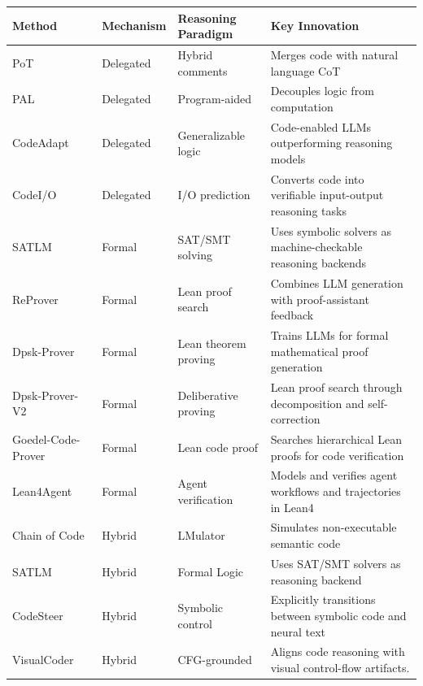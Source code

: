 \documentclass{llmxive}
\providecommand{\arraystretch}{1.15}
\begin{document}
\begin{table}[t]
\centering
\renewcommand{\arraystretch}{1.15}
\setlength{\tabcolsep}{4pt}
\footnotesize
\begin{tabularx}{\textwidth}{p{2.8cm}p{2.2cm}p{3.1cm}X}
\toprule
\textbf{Method} & \textbf{Mechanism} & \textbf{Reasoning Paradigm} & \textbf{Key Innovation} \\
\midrule
PoT~\cite{chen2022program} & Delegated & Hybrid comments & Merges code with natural language CoT \\
PAL~\cite{gao2023pal} & Delegated & Program-aided & Decouples logic from computation \\
CodeAdapt~\cite{zhang2025code} & Delegated & Generalizable logic & Code-enabled LLMs outperforming reasoning models \\
CodeI/O~\cite{pmlr-v267-li25t} & Delegated & I/O prediction & Converts code into verifiable input-output reasoning tasks \\
SATLM~\cite{ye2023satlm} & Formal & SAT/SMT solving & Uses symbolic solvers as machine-checkable reasoning backends \\
ReProver~\cite{yang2023leandojo} & Formal & Lean proof search & Combines LLM generation with proof-assistant feedback \\
Dpsk-Prover~\cite{xin2025deepseek} & Formal & Lean theorem proving & Trains LLMs for formal mathematical proof generation \\
Dpsk-Prover-V2~\cite{ren2025deepseek2} & Formal & Deliberative proving & Lean proof search through decomposition and self-correction \\
Goedel-Code-Prover~\cite{li2026goedel} & Formal & Lean code proof & Searches hierarchical Lean proofs for code verification \\
Lean4Agent~\cite{wang2026lean4agent} & Formal & Agent verification & Models and verifies agent workflows and trajectories in Lean4 \\
Chain of Code~\cite{li2023chain} & Hybrid & LMulator & Simulates non-executable semantic code \\
SATLM~\cite{ye2023satlm} & Hybrid & Formal Logic & Uses SAT/SMT solvers as reasoning backend \\
CodeSteer~\cite{chen2025codesteer} & Hybrid & Symbolic control & Explicitly transitions between symbolic code and neural text \\
VisualCoder~\cite{chi-etal-2025-visualcoder} & Hybrid & CFG-grounded & Aligns code reasoning with visual control-flow artifacts. \\

\end{tabularx}
\end{table}
\end{document}
